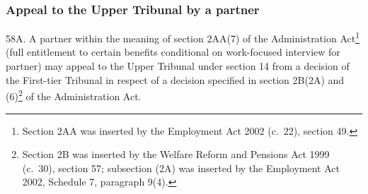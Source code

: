 \documentclass[12pt,a4paper]{article}
\begin{document}
%
%
%
%
%
%

\subsubsection[58A. Appeal to 
the Upper Tribunal  %
by a partner]{Appeal to 
the Upper Tribunal  %
by a partner}

58A.  A partner within the meaning of section 2AA(7) of the Administration Act\footnote{Section 2AA was inserted by the Employment Act 2002 (c.\ 22), section 49.} (full entitlement to certain benefits conditional on work-focused interview for partner) may appeal to 
the Upper Tribunal  %
under section 14 from a decision of 
the First-tier Tribunal  %
in respect of a decision specified in section 2B(2A) and (6)\footnote{Section 2B was inserted by the Welfare Reform and Pensions Act 1999 (c.\ 30), section 57; subsection (2A) was inserted by the Employment Act 2002, Schedule 7, paragraph 9(4).} of the Administration Act.
\end{document}
